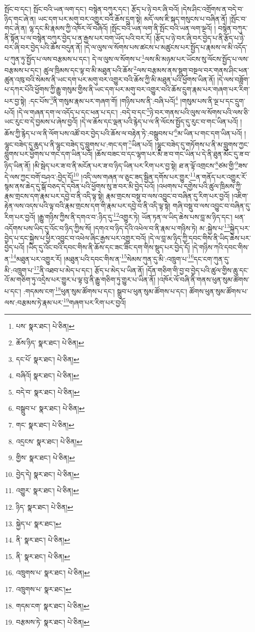 སྤོང་བ་དང་། སྤོང་བའི་ཡན་ལག་དང་། བསྙེན་བཀུར་དང་། རྩོད་པ་ཉེ་བར་ཞི་བའོ། །དེས་ཤིང་འགྲོགས་ན་བདེ་བ་ཉིད་གང་ཞེ་ན། ཡང་དག་པར་མགུ་བར་འགྱུར་བའི་ཆོས་དྲུག་སྟེ། མདོ་ལས་ཇི་སྐད་གསུངས་པ་བཞིན་ནོ། །སྤོང་བ་གང་ཞེ་ན། ལྷ་དང་མི་རྣམས་ཀྱི་འཁོར་ལོ་བཞིའོ། །སྤོང་བའི་ཡན་ལག་ནི་སྤོང་བའི་ཡན་ལག་ལྔའོ། །
བསྙེན་བཀུར་ནི་སྟོན་པ་ལ་བསྙེན་བཀུར་བྱེད་པ་ན་རྒྱས་པར་བག་ཡོད་པའི་བར་རོ། །རྩོད་པ་ཉེ་བར་ཞི་བར་བྱེད་པ་ནི་རྩོད་པ་ཉེ་བར་ཞི་བར་བྱེད་པའི་ཆོས་བདུན་ནོ། །དེ་ལ་ལུས་ལ་སོགས་པས་ཚངས་པ་མཚུངས་པར་སྤྱོད་པ་རྣམས་ལ་མི་འདོད་པ་ཀུན་ཏུ་སྤྱོད་པ་ལས་བརྩམས་པ་དང་། དེ་ལ་ལུས་ལ་སོགས་པ་\footnote{པས་  སྣར་ཐང་།  པེ་ཅིན། }ལས་མི་མཉམ་པར་ཡོངས་སུ་ལོངས་སྤྱོད་པ་ལས་བརྩམས་པ་དང་། ཚུལ་ཁྲིམས་དང་ལྟ་བ་མི་མཐུན་པའི་ཆོས་\footnote{ཆོས་ཉིད་  སྣར་ཐང་།  པེ་ཅིན། }ལས་བརྩམས་ནས་སྡུག་བསྔལ་བར་གནས་ཤིང་ཕན་ཚུན་འཁུ་བའི་སེམས་ནི་ཡང་དག་པར་མགུ་བར་འགྱུར་བའི་ཆོས་ཀྱི་མི་མཐུན་པའི་ཕྱོགས་ཡིན་ནོ། །དེ་ལས་བཟློག་པ་དཀར་པོའི་ཕྱོགས་ཀྱི་རྒྱུ་གསུམ་གྱིས་ནི་ཡང་དག་པར་མགུ་བར་འགྱུར་བའི་ཆོས་དྲུག་རྣམ་པར་གཞག་པར་རིག་པར་བྱ་སྟེ། :དང་པོས་\footnote{དང་པོ་  སྣར་ཐང་།  པེ་ཅིན། }ནི་གསུམ་རྣམ་པར་གཞག་གོ། །གཉིས་པས་ནི་:བཞི་པའོ།\footnote{བཞིའོ།  སྣར་ཐང་།  པེ་ཅིན། } །གསུམ་པས་ནི་ལྔ་པ་དང་དྲུག་པའོ། །དེ་ལ་གཞན་དག་ལ་འདོད་པ་དང་ཕན་པ་དང་། :བདེ་བ་དང་\footnote{བདེ་བ་  སྣར་ཐང་།  པེ་ཅིན། }ཉེ་བར་གནས་པའི་ལུས་ལ་སོགས་པའི་ལས་ཅི་ཡང་རུང་བ་དེ་བྱམས་པ་ཞེས་བྱའོ། །དེ་ལ་ཆོས་དང་ལྡན་པའི་རྙེད་པ་ལ་ནི་ལོངས་སྤྱོད་དུ་རུང་བ་གང་ཡིན་པའོ། །ཆོས་ཀྱི་རྙེད་པ་ལ་ནི་ལོག་པས་འཚོ་བར་བྱེད་པའི་ཆོས་ལ་བརྟེན་ཏེ་:བསྒྲུབས་པ་\footnote{བསྒྲུབ་པ་  སྣར་ཐང་།  པེ་ཅིན། }མ་ཡིན་པ་གང་དག་ཡིན་པའོ། །ལྷུང་བཟེད་དུ་ཆུད་པ་ནི་ལྷུང་བཟེད་དུ་བླུགས་པ་:གང་དག་\footnote{གང་  སྣར་ཐང་།  པེ་ཅིན། }ཡིན་པའོ། །ལྷུང་བཟེད་དུ་གཏོགས་པ་ནི་མ་བླུགས་ཀྱང་བླུགས་པར་ཕྱོགས་པ་གང་དག་ཡིན་པའོ། །ཆོས་བཟང་བ་དང་ལྷག་པར་མི་ཟ་བ་གང་ཡིན་པ་དེ་ནི་ཐུན་མོང་དུ་ཟ་བ་ཉིད་ཡིན་ནོ། །མི་སྦེད་པར་ཟ་བ་ནི་མངོན་པར་ཟ་བ་ཉིད་ཡིན་པར་རིག་པར་བྱ་སྟེ། ཐ་ན་ལྟོ་འགྲངས་\footnote{འདྲངས་  སྣར་ཐང་།  པེ་ཅིན། }ཙམ་གྱི་\footnote{གྱིས་  སྣར་ཐང་།  པེ་ཅིན། }ཟས་དེ་ལས་ཀྱང་བགོ་བཤའ་:བྱེད་དོ།\footnote{བྱེད་དེ།  སྣར་ཐང་།  པེ་ཅིན། } །འདི་ལས་གཞན་ལ་ཅུང་ཟད་སྦྱིན་དགོས་པར་གྱུར་\footnote{འགྱུར་  སྣར་ཐང་།  པེ་ཅིན། }ན་གནོད་པར་འགྱུར་རོ་སྙམ་ནས་ཆེད་དུ་སྒོ་བཅད་དེ་དབེན་པའི་ཕྱོགས་སུ་ཟ་བར་མི་བྱེད་པའོ། །འཕགས་པ་དགྱེས་པའི་ཚུལ་ཁྲིམས་ཀྱི་རྣམ་གྲངས་དག་རྣམ་པར་དབྱེ་བ་ནི་འདི་ལྟ་སྟེ། རྣམ་གྲངས་བསྡུ་བ་ལས་འབྱུང་བ་བཞིན་དུ་རིག་པར་བྱའོ། །འཇིག་རྟེན་ལས་འདས་པའི་ལྟ་བའི་རྣམ་གྲངས་དག་གི་རྣམ་པར་དབྱེ་བ་ནི་འདི་ལྟ་སྟེ། གཞི་བསྡུ་བ་ལས་འབྱུང་བ་བཞིན་དུ་རིག་པར་བྱའོ། །རྒྱུ་གཉིས་ཀྱིས་ནི་དགའ་བ་:ཉིད་དུ་\footnote{ཉིད་  སྣར་ཐང་།  པེ་ཅིན། }འགྱུར་ཏེ། ཡོན་ཏན་ལ་ཡིད་ཆེས་པས་བླ་མ་ཉིད་དང་། ཕན་འདོགས་པས་ཡིད་དུ་འོང་བ་ཉིད་ཀྱིས་སོ། །དགའ་བ་ཉིད་དེའི་འཕེལ་བ་ནི་རྣམ་པ་གཉིས་ཏེ། མ་:སྐྱེས་པ་\footnote{སྐྱེད་པ་  སྣར་ཐང་། }སྐྱེད་པར་བྱེད་པ་དང་སྐྱེས་པ་ཕྱིར་འབྱུང་བ་འཕེལ་ཞིང་རྒྱས་པར་འགྱུར་བའོ། །དེ་ལ་བླ་མ་ཉིད་ཀྱི་དབང་གིས་ནི་ཡིད་ཆེས་པར་བྱེད་པའོ། །ཡིད་དུ་འོང་བའི་དབང་གིས་ནི་ཆོས་དང་ཟང་ཟིང་དག་གིས་སྡུད་པར་བྱེད་དོ། །དེ་གཉིས་ཀའི་དབང་གིས་ན་\footnote{ནི་  སྣར་ཐང་།  པེ་ཅིན། }མཐུན་པར་འགྱུར་རོ། །མཐུན་པའི་དབང་གིས་ན་\footnote{ནི་  སྣར་ཐང་།  པེ་ཅིན། }སེམས་ཀུན་དུ་མི་:འཁྲུག་པ་\footnote{འཁྲུགས་པ་  སྣར་ཐང་།  པེ་ཅིན། }དང་ངག་ཀུན་དུ་མི་:འཁྲུག་པ་\footnote{འཁྲུགས་པ་  སྣར་ཐང་། }ནི་འཐབ་པ་མེད་པ་དང་། རྩོད་པ་མེད་པ་ཡིན་ནོ། །དོན་གཅིག་གི་བྱ་བ་བྱེད་པའི་ཚུལ་གྱིས་ཆུ་དང་འོ་མ་གཅིག་ཏུ་འདྲེས་པར་གྱུར་པ་ལྟ་བུ་ནི་རྒྱུ་གཅིག་ཏུ་གྱུར་པ་ཡིན་ནོ། །འཁོར་ལོ་བཞི་ནི་གནས་ཕུན་སུམ་ཚོགས་པ་དང་། :གདམས་ངག་\footnote{གདམ་ངག་  སྣར་ཐང་།  པེ་ཅིན། }ཕུན་སུམ་ཚོགས་པ་དང་། སྒྲུབ་པ་ཕུན་སུམ་ཚོགས་པ་དང་། ཚོགས་ཕུན་སུམ་ཚོགས་པ་ལས་:བརྩམས་ཏེ་རྣམ་པར་\footnote{བརྩམས་ཏེ་  སྣར་ཐང་།  པེ་ཅིན། }གཞག་པར་རིག་པར་བྱའོ། 